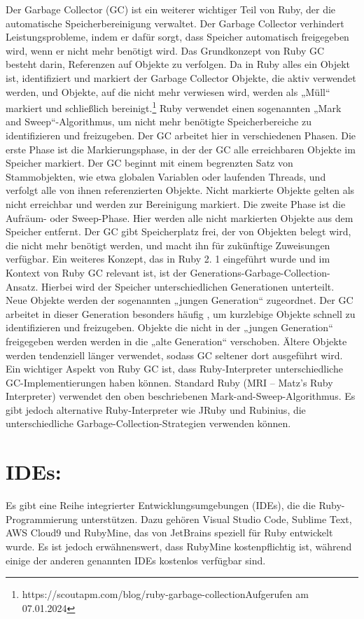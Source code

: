 \documentclass{article}
\begin{document}
Der Garbage Collector (GC) ist ein weiterer wichtiger Teil von Ruby, der die automatische Speicherbereinigung verwaltet.
Der Garbage Collector verhindert Leistungsprobleme, indem er dafür sorgt, dass Speicher automatisch freigegeben wird, wenn er nicht mehr benötigt wird.
Das Grundkonzept von Ruby GC besteht darin, Referenzen auf Objekte zu verfolgen.
Da in Ruby alles ein Objekt ist, identifiziert und markiert der Garbage Collector Objekte, die aktiv verwendet werden, und Objekte, auf die nicht mehr verwiesen wird, werden als „Müll“ markiert und schließlich bereinigt.\footnote{https://scoutapm.com/blog/ruby-garbage-collectionAufgerufen am 07.01.2024}
Ruby verwendet einen sogenannten „Mark and Sweep“-Algorithmus, um nicht mehr benötigte Speicherbereiche zu identifizieren und freizugeben.
 Der GC arbeitet hier in verschiedenen Phasen.
Die erste Phase ist die Markierungsphase, in der der GC alle erreichbaren Objekte im Speicher markiert.
Der GC beginnt mit einem begrenzten Satz von Stammobjekten, wie etwa globalen Variablen oder laufenden Threads, und verfolgt alle von ihnen referenzierten Objekte.
Nicht markierte Objekte gelten als nicht erreichbar und werden zur Bereinigung markiert.
Die zweite Phase ist die Aufräum- oder Sweep-Phase.
Hier werden alle nicht markierten Objekte aus dem Speicher entfernt.
Der GC gibt Speicherplatz frei, der von Objekten belegt wird, die nicht mehr benötigt werden, und macht ihn für zukünftige Zuweisungen verfügbar.
Ein weiteres Konzept, das in Ruby 2.
1 eingeführt wurde und im Kontext von Ruby GC relevant ist, ist der Generations-Garbage-Collection-Ansatz.
Hierbei wird der Speicher unterschiedlichen Generationen unterteilt.
Neue Objekte werden der sogenannten „jungen Generation“ zugeordnet.
Der GC arbeitet in dieser Generation besonders häufig , um kurzlebige Objekte schnell zu identifizieren und freizugeben.
Objekte die nicht in der „jungen Generation“ freigegeben werden werden in die „alte Generation“ verschoben.
Ältere Objekte werden tendenziell länger verwendet, sodass GC seltener dort ausgeführt wird.
Ein wichtiger Aspekt von Ruby GC ist, dass Ruby-Interpreter unterschiedliche GC-Implementierungen haben können.
Standard Ruby (MRI – Matz's Ruby Interpreter) verwendet den oben beschriebenen Mark-and-Sweep-Algorithmus.
Es gibt jedoch alternative Ruby-Interpreter wie JRuby und Rubinius, die unterschiedliche Garbage-Collection-Strategien verwenden können.

\section*{IDEs:}
Es gibt eine Reihe integrierter Entwicklungsumgebungen (IDEs), die die Ruby-Programmierung unterstützen.
Dazu gehören Visual Studio Code, Sublime Text, AWS Cloud9 und RubyMine, das von JetBrains speziell für Ruby entwickelt wurde.
Es ist jedoch erwähnenswert, dass RubyMine kostenpflichtig ist, während einige der anderen genannten IDEs kostenlos verfügbar sind.
\end{document}
